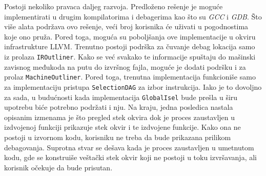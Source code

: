 \documentclass[12pt,oneside]{memoir}
\begin{document}

Postoji nekoliko pravaca daljeg razvoja.
Predloženo rešenje je moguće implementirati u drugim kompilatorima i debagerima kao što su \textit{GCC} i \textit{GDB}.
Što više alata podržava ovo rešenje, veći broj korisnika će uživati u pogodnostima koje ono pruža.
Pored toga, moguća su poboljšanja ove implementacije u okviru infrastrukture LLVM.
Trenutno postoji podrška za čuvanje debag lokacija samo iz prolaza \verb|IROutliner|.
Kako se već svakako te informacije spuštaju do mašinski zavisnog međukoda na putu do izvršnog fajla, moguće je dodati podršku i za prolaz \verb|MachineOutliner|.
Pored toga, trenutna implementacija funkcioniše samo za implementaciju pristupa \verb|SelectionDAG| za izbor instrukcija.
Iako je to dovoljno za sada, u budućnosti kada implementacija \verb|GlobalIsel| bude prešla u širu upotrebu biće potrebno podržati i nju.
Na kraju, jedna posledica nastala opisanim izmenama je što pregled stek okvira dok je proces zaustavljen u izdvojenoj funkciji prikazuje stek okvir i te izdvojene funkcije.
Kako ona ne postoji u izvornom kodu, korisniku ne treba da bude prikazana prilikom debagovanja.
Suprotna stvar se dešava kada je proces zaustavljen u umetnutom kodu, gde se konstruiše veštački stek okvir koji ne postoji u toku izvršavanja, ali korisnik očekuje da bude prisutan.

\literatura

\backmatter
\end{document}
